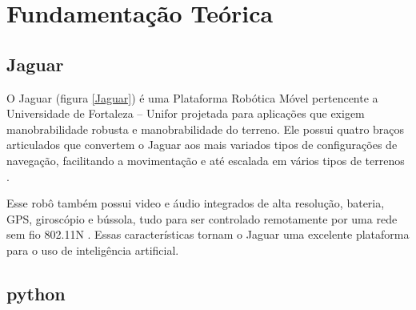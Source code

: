 \chapter{Fundamentação Teórica}
\label{cap:fundamentacao-teorica}

\section{Jaguar}
\label{sec:jaguar}

 O Jaguar (figura \ref{Jaguar}) é uma Plataforma Robótica Móvel pertencente a Universidade de Fortaleza – Unifor projetada para aplicações que exigem manobrabilidade robusta e manobrabilidade do terreno. Ele possui quatro braços articulados que convertem o Jaguar aos mais variados tipos de configurações de navegação, facilitando a movimentação e até escalada em vários tipos de terrenos \cite{jaguar}. 

Esse robô também possui video e áudio integrados de alta resolução, bateria, GPS, giroscópio e bússola, tudo para ser controlado remotamente por uma rede sem fio 802.11N \cite{jaguar}. 
Essas características tornam o Jaguar uma excelente plataforma para o uso de inteligência artificial. 

\begin{figure}[H]
	\centering
\end{figure}

\section{python}
\label{sec:python}

